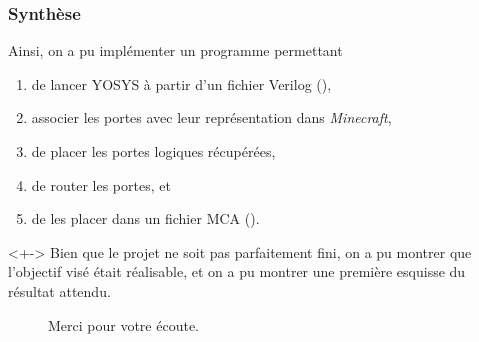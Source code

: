 \documentclass[aspectratio = 1610, french]{beamer}
\newcommand{\textimp}[1]{\textcolor{teal}{\text{#1}}}
\begin{document}
\begin{frame}

\frametitle{Synthèse}

Ainsi, on a pu implémenter un programme permettant

\begin{enumerate}
    \item<+-> de lancer YOSYS à partir d'un fichier Verilog (\textimp{bogué}),
    \item<+-> associer les portes avec leur représentation dans \emph{Minecraft},
    \item<+-> de placer les portes logiques récupérées,
    \item<+-> de router les portes, et
    \item<+-> de les placer dans un fichier MCA (\textimp{bogué}).
\end{enumerate}

\begin{actionenv}<+->
Bien que le projet ne soit pas parfaitement fini, on a pu montrer que l'objectif visé était réalisable, et on a pu montrer une première esquisse du résultat attendu.
\end{actionenv}

\end{frame}

\begin{frame}

\begin{figure}[t]
\centering\Large
Merci pour votre écoute.
\end{figure}

\begin{figure}[b]
\doclicenseThis
\end{figure}

\end{frame}
\end{document}
